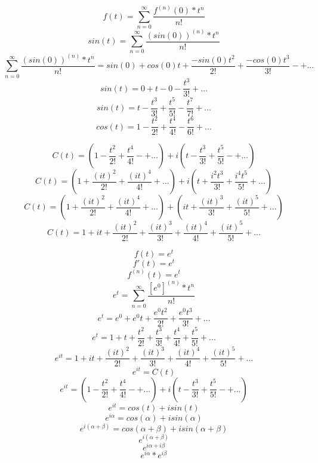 \documentclass{article}
\begin{document}
\[f(t) = \sum_{n=0}^{\infty} \frac{f^{(n)}(0)*t^n}{n!} \]
\newline
\newline
\[sin(t) = \sum_{n=0}^{\infty} \frac{(sin(0))^{(n)}*t^n}{n!} \]
\[\sum_{n=0}^{\infty} \frac{(sin(0))^{(n)}*t^n}{n!} = sin(0) + cos(0)t + \frac{-sin(0)t^2}{2!} + \frac{-cos(0)t^3}{3!} -+ ...\]
\[sin(t) = 0 + t - 0 - \frac{t^3}{3!} + ...\]
\[sin(t) = t - \frac{t^3}{3!} + \frac{t^5}{5!} - \frac{t^7}{7!} + ...\]
\newline
\[cos(t) = 1 - \frac{t^2}{2!} + \frac{t^4}{4!} - \frac{t^6}{6!} + ...\]
\newline
\newline

\[C(t) = (1 - \frac{t^2}{2!} + \frac{t^4}{4!} -+ ...) + i( t - \frac{t^3}{3!} + \frac{t^5}{5!} -+ ...)\]
\newline
\[C(t) = (1 + \frac{(it)^2}{2!} + \frac{(it)^4}{4!} + ...) + i(t + \frac{i^2t^3}{3!} + \frac{i^4t^5}{5!} + ...)\]
\newline
\[C(t) = (1 + \frac{(it)^2}{2!} + \frac{(it)^4}{4!} + ...) + (it + \frac{(it)^3}{3!} + \frac{(it)^5}{5!} + ...)\]
\newline
\[C(t) = 1 + it + \frac{(it)^2}{2!} + \frac{(it)^3}{3!} + \frac{(it)^4}{4!} + \frac{(it)^5}{5!} + ...\]


\[f(t) = e^t\]
\[f'(t) = e^t\]
\[f^{(n)}(t) = e^t\]
\newline
\[e^t = \sum_{n=0}^{\infty} \frac{[e^0]^{(n)} * t^n}{n!}\]
\[e^t = e^0 + e^0t + \frac{e^0t^2}{2!} + \frac{e^0t^3}{3!} + ...\]
\[e^t = 1 + t + \frac{t^2}{2!} + \frac{t^3}{3!} + \frac{t^4}{4!} + \frac{t^5}{5!} +...\]
\[e^{it} = 1 + it + \frac{(it)^2}{2!} + \frac{(it)^3}{3!} + \frac{(it)^4}{4!} + \frac{(it)^5}{5!} + ...\]
\newline
\[e^{it} = C(t)\]
\[e^{it} = (1 - \frac{t^2}{2!} + \frac{t^4}{4!} -+ ...) + i( t - \frac{t^3}{3!} + \frac{t^5}{5!} -+ ...)\]
\[e^{it} = cos(t) + isin(t)\]
\newline
\[e^{i\alpha} = cos(\alpha) + isin(\alpha)\]
\newline
\[e^{i(\alpha + \beta)} = cos(\alpha + \beta) + isin(\alpha + \beta)\] 
\[e^{i(\alpha + \beta)}\]
\[e^{i\alpha + i\beta}\]
\[e^{i\alpha} * e^{i\beta}\]
\end{document}
